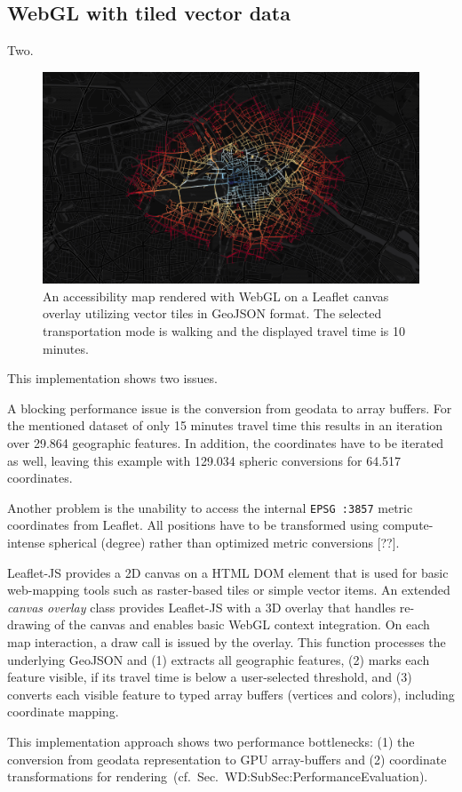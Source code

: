     \subsection{WebGL with tiled vector data}
      Two.
      \begin{figure}[h]
        \centering
        \includegraphics[width=0.7\linewidth]{./img/screenshot-poc2-600s-vector.png}
        \caption{An accessibility map rendered with WebGL on a Leaflet canvas overlay utilizing vector tiles in GeoJSON format. The selected transportation mode is walking and the displayed travel time is 10 minutes.}
        \label{fig:poc:two}
      \end{figure}
      This implementation shows two issues.\par
      A blocking performance issue is the conversion from geodata to array buffers. For the mentioned dataset of only 15 minutes travel time this results in an iteration over 29.864 geographic features. In addition, the coordinates have to be iterated as well, leaving this example with 129.034 spheric conversions for 64.517 coordinates.\par
      Another problem is the unability to access the internal \texttt{EPSG :3857} metric coordinates from Leaflet. All positions have to be transformed using compute-intense spherical (degree) rather than optimized metric conversions [??].\par
      Leaflet-JS provides a 2D canvas on a HTML DOM element that is used for basic
      web-mapping tools such as raster-based tiles or simple vector items. An extended
      \textsl{canvas overlay} class provides Leaflet-JS with a 3D overlay that handles
      re-drawing of the canvas and enables basic WebGL context integration. On each map
      interaction, a draw call is issued by the overlay. This function processes the
      underlying GeoJSON and (1) extracts all geographic features, (2) marks each feature
      visible, if its travel time is below a user-selected threshold, and (3) converts
      each visible feature to typed array buffers (vertices and colors), including coordinate mapping.\par
      This implementation approach shows two performance bottlenecks: (1) the conversion
      from geodata representation to GPU array-buffers and (2) coordinate transformations
      for rendering~(cf.~Sec.~{WD:SubSec:PerformanceEvaluation}). \par
